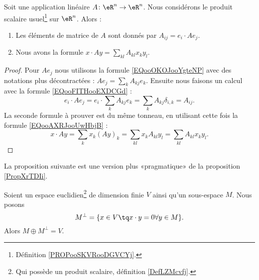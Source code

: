 \begin{proposition}     \label{PROPooZKWXooWmEzoA}
    Soit une application linéaire \( A\colon \eR^n\to \eR^n\). Nous considérons le produit scalaire usuel\footnote{Définition \ref{PROPooSKVRooDGVCYj}.} sur \( \eR^n\). Alors :
    \begin{enumerate}
        \item
            Les éléments de matrice de \( A\) sont donnés par \( A_{ij}=e_i\cdot Ae_j\).
        \item
            Nous avons la formule \( x\cdot Ay=\sum_{kl}A_{kl}x_ky_l \).
    \end{enumerate}
\end{proposition}

\begin{proof}
    Pour \( Ae_j\) nous utilisons la formule \ref{EQooOKOJooYgteNP} avec des notations plus décontractées : \( Ae_j=\sum_kA_{kj}e_k\). Ensuite nous faisons un calcul avec la formule \eqref{EQooFITHooEXDCGd} :
    \begin{equation}
        e_i\cdot Ae_j=e_i\cdot \sum_kA_{kj}e_k=\sum_{k}A_{kj}\delta_{i,k}=A_{ij}.
    \end{equation}
    La seconde formule à prouver est du même tonneau, en utilisant cette fois la formule \eqref{EQooAXRJooUwHbjB} :
    \begin{equation}
        x\cdot Ay=\sum_kx_k(Ay)_k=\sum_{kl}x_kA_{kl}y_l=\sum_{kl}A_{kl}x_ky_l.
    \end{equation}
\end{proof}

La proposition suivante est une version plus «pragmatique» de la proposition \ref{PropXrTDIi}.
\begin{proposition}       \label{PROPooNITTooCYcrrT}
    Soient un espace euclidien\footnote{Qui possède un produit scalaire, définition \ref{DefLZMcvfj}.} de dimension finie \( V\) ainsi qu'un sous-espace \( M\). Nous posons
    \begin{equation}
        M^{\perp}=\{ x\in V\tq x\cdot y=0\forall y\in M \}.
    \end{equation}
    Alors \( M\oplus M^{\perp}=V\).
\end{proposition}

